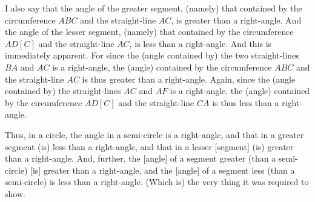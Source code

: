\begin{Parallel}{}{}
{I also say that the angle of the greater segment, (namely) that contained by
the circumference $ABC$ and the straight-line $AC$, is greater than a right-angle.
And the angle of the lesser segment, (namely) that contained by the circumference
$AD[C]$ and the straight-line $AC$, is less than a right-angle. And
this is immediately apparent. For since the (angle contained by) the
two straight-lines $BA$ and $AC$ is a right-angle, the (angle) contained
by the circumference $ABC$ and the straight-line $AC$ is thus greater than a right-angle. Again, since the (angle contained by) the straight-lines
$AC$ and $AF$ is a right-angle, the (angle) contained by the circumference
$AD[C]$ and the straight-line $CA$ is thus less than a right-angle.

Thus, in a circle, the angle in a semi-circle is a right-angle, and that in a
greater segment (is) less than a right-angle, and that in a
lesser [segment] (is) greater than a right-angle. And, further, the [angle] of
a segment greater (than a semi-circle) [is] greater than a right-angle, and
the [angle] of a segment less (than a semi-circle) is  less than a right-angle.
(Which is) the very thing it was required to show.}
\end{Parallel}

